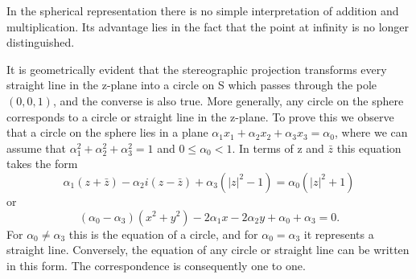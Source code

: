 In the spherical representation there is no simple interpretation of addition and multiplication. Its advantage lies in the fact that the point at infinity is no longer distinguished.

It is geometrically evident that the stereographic projection transforms every straight line in the z-plane into a circle on S which passes through the pole $(0,0,1)$, and the converse is also true. More generally, any circle on the sphere corresponds to a circle or straight line in the z-plane. To prove this we observe that a circle on the sphere lies in a plane $\alpha_{1}x_{1} + \alpha_{2}x_{2} + \alpha_{3}x_{3} = \alpha_{0}$, where we can assume that $\alpha_{1}^{2} + \alpha_{2}^{2} + \alpha_{3}^{2} = 1$ and $0 \leq \alpha_{0} < 1$. In terms of z and $\bar{z}$ this equation takes the form
\begin{equation*}
\alpha_ {1} (z + \bar {z}) - \alpha_ {2} i (z - \bar {z}) + \alpha_ {3} (| z | ^ {2} - 1) = \alpha_ {0} (| z | ^ {2} + 1)
\end{equation*}
or
\begin{equation*}
(\alpha_ {0} - \alpha_ {3}) (x ^ {2} + y ^ {2}) - 2 \alpha_ {1} x - 2 \alpha_ {2} y + \alpha_ {0} + \alpha_ {3} = 0.
\end{equation*}
For $\alpha_{0} \neq \alpha_{3}$ this is the equation of a circle, and for $\alpha_{0} = \alpha_{3}$ it represents a straight line. Conversely, the equation of any circle or straight line
can be written in this form. The correspondence is consequently one to one.

